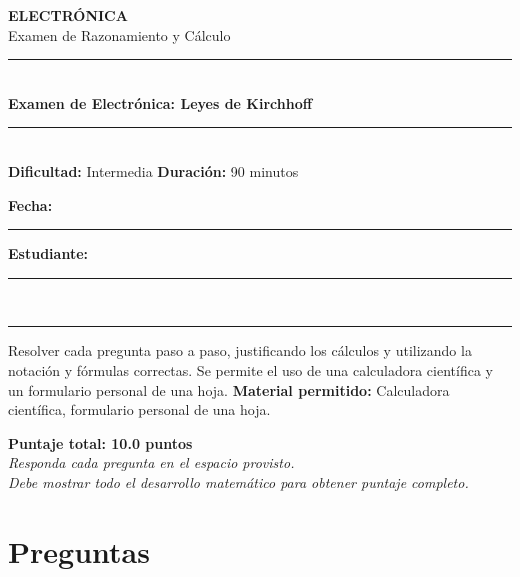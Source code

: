 \documentclass[11pt,a4paper]{article}
\begin{document}
\begin{center}
  {\Large\bfseries\color{azulTitulo} ELECTRÓNICA}\\[4pt]
  {\large Examen de Razonamiento y Cálculo}\\[8pt]
  \rule{\linewidth}{1.2pt}\\[6pt]
  {\LARGE\bfseries Examen de Electrónica: Leyes de Kirchhoff}\\[6pt]
  \rule{\linewidth}{0.6pt}\\[6pt]
  {\large \textbf{Dificultad:} Intermedia \hfill
   \textbf{Duración:} 90 minutos} \\[4pt]
  {\large \textbf{Fecha:} \rule{4cm}{0.2pt} \hfill
   \textbf{Estudiante:} \rule{6cm}{0.2pt}} \\[6pt]
  \rule{\linewidth}{0.2pt}
\end{center}

\vspace{4pt}
\begin{tcolorbox}[cajaInstrucciones, title={Instrucciones}]
Resolver cada pregunta paso a paso, justificando los cálculos y utilizando la notación y fórmulas correctas. Se permite el uso de una calculadora científica y un formulario personal de una hoja.
\medskip
\textbf{Material permitido:} Calculadora científica, formulario personal de una hoja.
\end{tcolorbox}

\vspace{4pt}
\begin{center}
  \begin{tcolorbox}[
    enhanced,
    colback=white, colframe=azulTitulo,
    width=0.6\linewidth,
    boxrule=1.5pt,
    halign=center, valign=center,
    top=4pt, bottom=4pt,
  ]
    \centering
    \textbf{Puntaje total: 10.0 puntos} \\
    \small\textit{Responda cada pregunta en el espacio provisto. \\
    Debe mostrar todo el desarrollo matemático para obtener puntaje completo.}
  \end{tcolorbox}
\end{center}

\section*{Preguntas}
\end{document}
